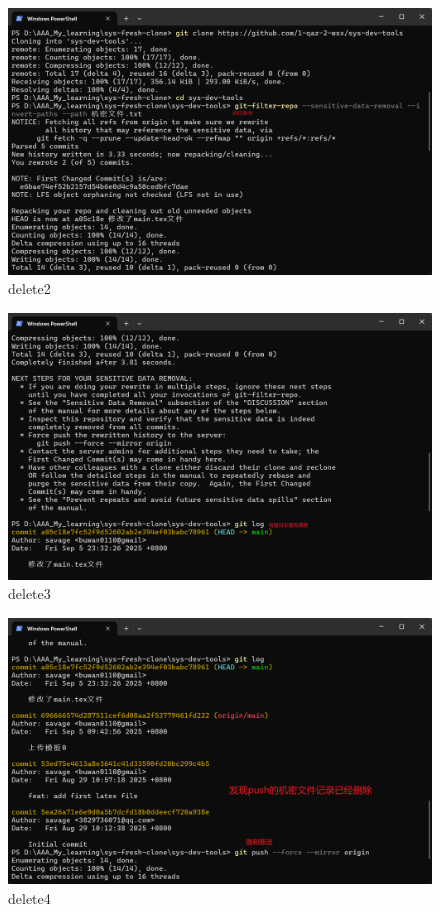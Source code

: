 \documentclass[a4paper]{article}
\begin{document}
        \begin{figure}[H]
    \centering
    \includegraphics[width=1\textwidth]{images/delete2.png}
    \caption{delete2}
    \end{figure}
    \vspace{1cm}

        \begin{figure}[H]
    \centering
    \includegraphics[width=1\textwidth]{images/delete3.png}
    \caption{delete3}
    \end{figure}
    \vspace{1cm}

        \begin{figure}[H]
    \centering
    \includegraphics[width=1\textwidth]{images/delete4.png}
    \caption{delete4}
    \end{figure}
\end{document}
